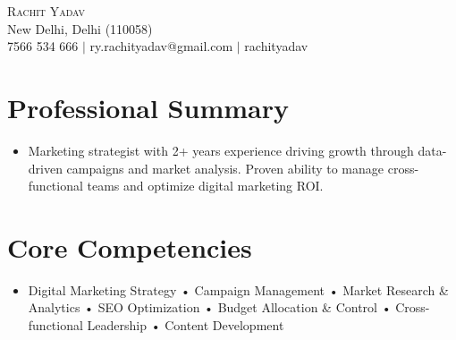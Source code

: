 \documentclass[a4paper,11pt]{article}
\newcommand{\resumeItem}[1]{\item #1}
\newcommand{\resumeItemListStart}{\begin{itemize}[leftmargin=0.2in, itemsep=0pt, parsep=0pt]}
\newcommand{\resumeItemListEnd}{\end{itemize}\vspace{-5pt}}
\begin{document}
\begin{center}
     {\LARGE \scshape Rachit Yadav} \\ 
    \small New Delhi, Delhi (110058) \\ \vspace{1.5mm}
     7566 534 666 $|$
     ry.rachityadav@gmail.com $|$
     rachityadav
\end{center}

\section{Professional Summary}
\resumeItemListStart
\resumeItem{Marketing strategist with 2+ years experience driving growth through data-driven campaigns and market analysis. Proven ability to manage cross-functional teams and optimize digital marketing ROI.}
\resumeItemListEnd

\section{Core Competencies}
\resumeItemListStart
\resumeItem{Digital Marketing Strategy • Campaign Management • Market Research \& Analytics • SEO Optimization • Budget Allocation \& Control • Cross-functional Leadership • Content Development}
\resumeItemListEnd
\end{document}

